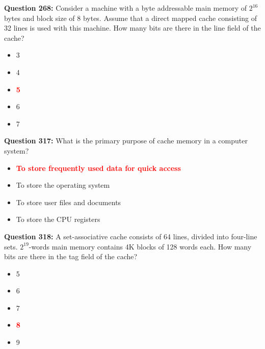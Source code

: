 \documentclass[12pt,a4paper]{article}
\begin{document}
\vspace{0.5cm}

\vspace{0.5cm}

\textbf{Question 268:} Consider a machine with a byte addressable main memory of $2^{16}$ bytes and block size of 8 bytes. Assume that a direct mapped cache consisting of 32 lines is used with this machine. How many bits are there in the line field of the cache?

\begin{itemize}
    \item[\textbf{A.}] 3
    \item[\textbf{B.}] 4
    \item[\textbf{C.}] \textcolor{red}{\textbf{5}}
    \item[\textbf{D.}] 6
    \item[\textbf{E.}] 7
\end{itemize}

\vspace{0.5cm}

\vspace{0.5cm}

\textbf{Question 317:} What is the primary purpose of cache memory in a computer system?

\begin{itemize}
    \item[\textbf{A.}] \textcolor{red}{\textbf{To store frequently used data for quick access}}
    \item[\textbf{B.}] To store the operating system
    \item[\textbf{C.}] To store user files and documents
    \item[\textbf{D.}] To store the CPU registers
\end{itemize}

\vspace{0.5cm}

\vspace{0.5cm}

\textbf{Question 318:} A set-associative cache consists of 64 lines, divided into four-line sets. $2^{19}$-words main memory contains 4K blocks of 128 words each. How many bits are there in the tag field of the cache?

\begin{itemize}
    \item[\textbf{A.}] 5
    \item[\textbf{B.}] 6
    \item[\textbf{C.}] 7
    \item[\textbf{D.}] \textcolor{red}{\textbf{8}}
    \item[\textbf{E.}] 9
\end{itemize}
\end{document}

